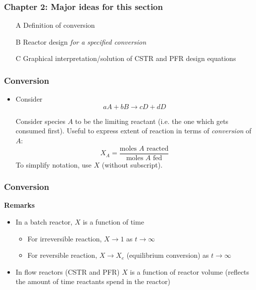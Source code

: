 \begin{frame}\frametitle{\textbf{Chapter 2}: Major ideas for this section}
	\begin{itemize}
		\item[A] Definition of conversion
		\item[B] Reactor design \emph{for a specified conversion}
		\item[C] Graphical interpretation/solution of CSTR and PFR design equations
	\end{itemize}
\end{frame}

\begin{frame}\frametitle{Conversion}
	\begin{itemize}
		\item	Consider $$aA + bB \longrightarrow cD + dD$$

		Consider species $A$ to be the limiting reactant (i.e. the one which gets consumed first). Useful to express extent of reaction in terms of \textit{\color{blue}conversion} of $A$: $$X_A = \frac{\text{moles }A\text{ reacted}}{\text{moles } A\text{ fed}}$$ To simplify notation, use $X$ (without subscript).
	\end{itemize}
\end{frame}

\begin{frame}\frametitle{Conversion}
	\textbf{Remarks}
	\begin{itemize}
		\item	In a batch reactor, $X$ is a function of time
		\begin{itemize}
			\item	For irreversible reaction, $X\rightarrow1$ as $t\rightarrow\infty$
			\item	For reversible reaction, $X\rightarrow X_e$ (equilibrium conversion) as $t\rightarrow\infty$
		\end{itemize}
		\item	In flow reactors (CSTR and PFR) $X$ is a function of reactor volume (reflects the amount of time reactants spend in the reactor)
	\end{itemize}
\end{frame}

